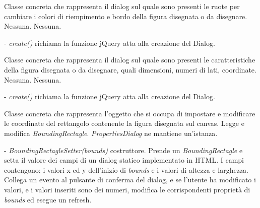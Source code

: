 Classe concreta che rappresenta il dialog sul quale sono presenti le ruote per cambiare i colori di riempimento e bordo della figura disegnata o da disegnare.
Nessuna.
Nessuna.
\begin{elencopuntato}[\subsubsecindent]
\item[-] \textit{create()} richiama la funzione jQuery atta alla creazione del Dialog.
\end{elencopuntato}

Classe concreta che rappresenta il dialog sul quale sono presenti le caratteristiche della figura disegnata o da disegnare, quali dimensioni, numeri di lati, coordinate.
Nessuna.
Nessuna.
\begin{elencopuntato}[\subsubsecindent]
\item[-] \textit{create()} richiama la funzione jQuery atta alla creazione del Dialog.
\end{elencopuntato}

Classe concreta che rappresenta l'oggetto che si occupa di impostare e modificare le coordinate del rettangolo contenente la figura disegnata sul canvas.
Legge e modifica \textit{BoundingRectagle}.
\textit{PropertiesDialog} ne mantiene un'istanza.
\begin{elencopuntato}[\subsubsecindent]
\item[-] \textit{BoundingRectagleSetter(bounds)} costruttore. Prende un \textit{BoundingRectagle} e setta il valore dei campi di un dialog statico implementato in HTML. I campi contengono: i valori x ed y dell'inizio di \textit{bounds} e i valori di altezza e larghezza. Collega un evento al pulsante di conferma del dialog, e se l'utente ha modificato i valori, e i valori inseriti sono dei numeri, modifica le corrispondenti propriet\`a di \textit{bounds} ed esegue un refresh.
\end{elencopuntato}

